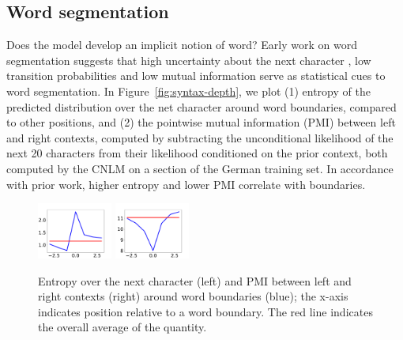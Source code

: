 \subsection{Word segmentation}
\label{sec:segmentation}



Does the model develop an implicit notion of word?
Early work on word segmentation suggests that high uncertainty about the next character \cite{cohen-algorithm-2001, feng-accessor-2004},  low transition probabilities \cite{harris-distributional-1954, saffran-word-1996} and low mutual information \cite{sun-chinese-1998} serve as statistical cues to word segmentation.
In Figure~\ref{fig:syntax-depth}, we plot (1) entropy of the predicted distribution over the net character around word boundaries, compared to other positions, and (2) the pointwise mutual information (PMI) between left and right contexts, computed by subtracting the unconditional likelihood of the next 20 characters from their likelihood conditioned on the prior context, both computed by the CNLM on a section of the German training set.
In accordance with prior work, higher entropy and lower PMI correlate with boundaries.


\begin{figure}
	\begin{center}
\includegraphics[width=0.22\textwidth]{figures/segmentation-profile-flattened-entropies-english.pdf}
\includegraphics[width=0.22\textwidth]{figures/segmentation-profile-flattened-pmis-english.pdf}
	\end{center}
	\caption{Entropy over the next character (left) and PMI between left and right contexts (right) around word boundaries (blue); the x-axis indicates position relative to a word boundary. The red line indicates the overall average of the quantity. }\label{fig:boundaries-entropy}
\end{figure}


